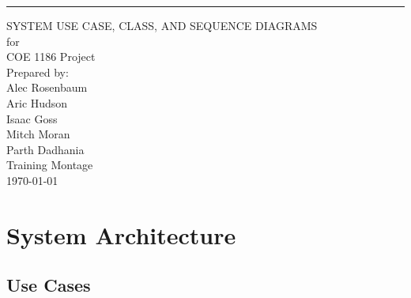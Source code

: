 \documentclass{scrreprt}
\begin{document}
\begin{flushright}
    \rule{16cm}{5pt}\vskip1cm
    \begin{bfseries}
        \Huge{SYSTEM USE CASE, CLASS, AND SEQUENCE DIAGRAMS}\\
        \vspace{.9cm}
        for\\
        \vspace{.9cm}
        COE 1186 Project\\
        \vspace{.9cm}
        \vspace{.9cm}
        Prepared by:\\
        Alec Rosenbaum\\
        Aric Hudson\\
        Isaac Goss\\
        Mitch Moran\\
	    Parth Dadhania\\
        \vspace{1.9cm}
        Training Montage\\
        \vspace{.9cm}
        \today\\
    \end{bfseries}
\end{flushright}

\tableofcontents

\chapter{System Architecture}

\section{Use Cases}
\end{document}
